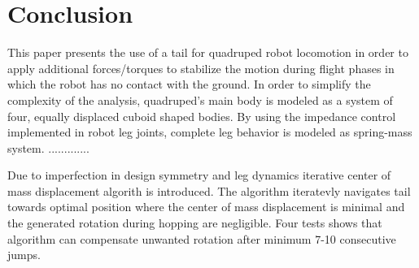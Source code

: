 \section{Conclusion}\label{sec:conclusion}
 
This paper presents the use of a tail for quadruped robot locomotion in order to apply additional forces/torques to stabilize the motion during flight phases in which the robot has no contact with the ground. In order to simplify the complexity of the analysis, quadruped's main body is modeled as a system of four, equally displaced cuboid shaped bodies. By using the impedance control implemented in robot leg joints, complete leg behavior is modeled as spring-mass system.   
.............

Due to imperfection in design symmetry and leg dynamics iterative center of mass displacement algorith is introduced. The algorithm iteratevly navigates tail towards optimal position where the center of mass displacement is minimal and the generated rotation during hopping are negligible. Four tests shows that algorithm can compensate unwanted rotation after minimum 7-10 consecutive jumps. 